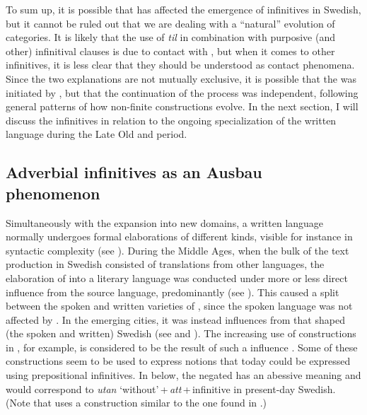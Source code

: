 \documentclass[output=paper]{langscibook}
\begin{document}
To sum up, it is possible that  has affected the emergence of  infinitives in Swedish, but it cannot be ruled out that we are dealing with a “natural” evolution of  categories. It is likely that the use of \textit{til} in combination with purposive (and other) infinitival clauses is due to contact with , but when it comes to other  infinitives, it is less clear that they should be understood as contact phenomena. Since the two explanations are not mutually exclusive, it is possible that the  was initiated by , but that the continuation of the process was independent, following general patterns of how  non-finite constructions evolve. In the next section, I will discuss the  infinitives in relation to the ongoing specialization of the written language during the Late Old and  period. 


\subsection{Adverbial infinitives as an Ausbau phenomenon}\label{sec:kalm:5.2}


Simultaneously with the expansion into new domains, a written language normally undergoes formal elaborations of different kinds, visible for instance in syntactic complexity (see \cites[38--39]{Fischer2007}[]{Kloss1967}). During the Middle Ages, when the bulk of the text production in Swedish consisted of translations from other languages, the elaboration of  into a literary language was conducted under more or less direct influence from the source language, predominantly  (see \citealt{Wollin1981,Wollin1983,Hoder2009, Hoder2010}). This caused a split between the spoken and written varieties of , since the spoken language was not affected by . In the emerging cities, it was instead influences from  that shaped (the spoken and written) Swedish (see  and ). The increasing use of  constructions in , for example, is considered to be the result of such a  influence \citep{Ahlberg1942,Hoder2010}. Some of these  constructions seem to be used to express  notions that today could be expressed using prepositional infinitives. In  below, the negated  has an abessive meaning and would correspond to \textit{utan} ‘without’\,+\,\textit{att}\,+\,infinitive in present-day Swedish. (Note that  uses a construction similar to the one found in .)
\end{document}
